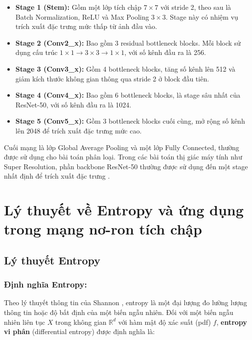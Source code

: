 \begin{itemize}
    \item \textbf{Stage 1 (Stem):} Gồm một lớp tích chập $7 \times 7$ với stride 2, theo sau là Batch Normalization, ReLU và Max Pooling $3 \times 3$. Stage này có nhiệm vụ trích xuất đặc trưng mức thấp từ ảnh đầu vào.
    
    \item \textbf{Stage 2 (Conv2\_x):} Bao gồm 3 residual bottleneck blocks. Mỗi block sử dụng cấu trúc $1 \times 1 \rightarrow 3 \times 3 \rightarrow 1 \times 1$, với số kênh đầu ra là 256.
    
    \item \textbf{Stage 3 (Conv3\_x):} Gồm 4 bottleneck blocks, tăng số kênh lên 512 và giảm kích thước không gian thông qua stride 2 ở block đầu tiên.
    
    \item \textbf{Stage 4 (Conv4\_x):} Bao gồm 6 bottleneck blocks, là stage sâu nhất của ResNet-50, với số kênh đầu ra là 1024.
    
    \item \textbf{Stage 5 (Conv5\_x):} Gồm 3 bottleneck blocks cuối cùng, mở rộng số kênh lên 2048 để trích xuất đặc trưng mức cao.
\end{itemize}

Cuối mạng là lớp Global Average Pooling và một lớp Fully Connected, thường được sử dụng cho bài toán phân loại. Trong các bài toán thị giác máy tính như Super Resolution, phần backbone ResNet-50 thường được sử dụng đến một stage nhất định để trích xuất đặc trưng \citep{he2016deep}.


\section{Lý thuyết về Entropy và ứng dụng trong mạng nơ-ron tích chập}

\subsection{Lý thuyết Entropy}

\subsubsection{Định nghĩa Entropy:}


Theo lý thuyết thông tin của Shannon \citep{shannon1948}, entropy là một đại lượng đo lường lượng thông tin hoặc độ bất định của một biến ngẫu nhiên. Đối với một biến ngẫu nhiên liên tục \(X\) trong không gian \(\mathbb{R}^{d}\) với hàm mật độ xác suất (pdf) \(f\), \textbf{entropy vi phân} (differential entropy) được định nghĩa là:

